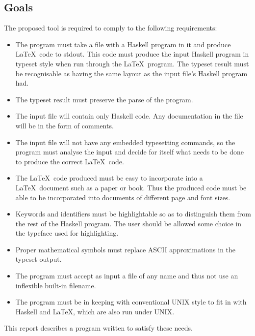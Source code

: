 \subsection*{Goals}

The proposed tool is required to comply to the following requirements:
\begin{itemize}
\item The program must take a file with a Haskell program in it and produce
\LaTeX\ code to stdout.  This code must produce the input Haskell program in
typeset style when run through
the \LaTeX\ program.  The typeset result must be recognisable as having the same
layout as the input file's Haskell program had.

\item The typeset result must preserve the parse of the program.

\item The input file will contain only Haskell code.  Any documentation in the file
will be in the form of comments.

\item The input file will not have any embedded typesetting commands, so
the program must analyse the input and decide for itself what needs to be 
done to produce the correct \LaTeX\ code.

\item The \LaTeX\ code produced must be easy to incorporate into a \LaTeX\
document such as a paper or book.  Thus the produced code must be able 
to be incorporated into documents of different page and font sizes.

\item Keywords and identifiers must be highlightable so as to distinguish
them from the rest of the Haskell program.
The user should be allowed some choice in the typeface used for
highlighting.

\item Proper mathematical symbols must replace ASCII approximations in the
typeset output.

\item The program must accept as input
a file of any name and thus not use an inflexible built-in filename.

\item The program must be in keeping with conventional UNIX style to fit in with
Haskell and \LaTeX , which are also run under UNIX.
\end{itemize}

\noindent This report describes a program written to satisfy these needs.

